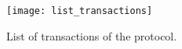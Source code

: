 \begin{figure}[!htbp]
    \centering
    \texttt{[image: list\_transactions]}
    \caption{List of transactions of the protocol.}
    \label{fig:list_transactions}
\end{figure}
    